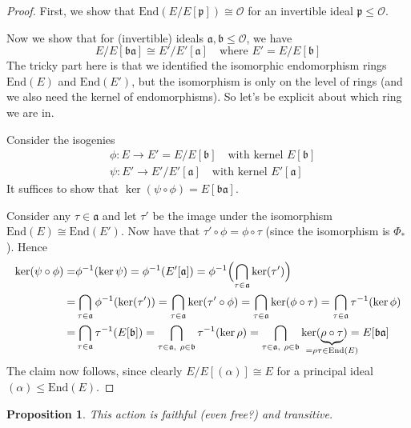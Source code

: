 \documentclass{scrartcl}
\newcommand{\End}{\mathrm{End}}
\newcommand{\Order}{\mathcal{O}}
\newtheorem{prop}{Proposition}[section]
\theoremstyle{definition}
\begin{document}
\begin{proof}
    First, we show that $\End(E/E[\mathfrak{p}]) \cong \Order$ for an invertible ideal $\mathfrak{p} \leq \Order$.

    Now we show that for (invertible) ideals $\mathfrak{a}, \mathfrak{b} \leq \Order$, we have
    \begin{equation*}
        E/E[\mathfrak{b}\mathfrak{a}] \cong E'/E'[\mathfrak{a}] \quad \text{where $E' = E/E[\mathfrak{b}]$}
    \end{equation*}
    The tricky part here is that we identified the isomorphic endomorphism rings $\End(E)$ and $\End(E')$, but the isomorphism is only on the level of rings (and we also need the kernel of endomorphisms).
    So let's be explicit about which ring we are in.

    Consider the isogenies
    \begin{align*}
        &\phi: E \to E' = E/E[\mathfrak{b}] \quad \text{with kernel $E[\mathfrak{b}]$} \\
        &\psi: E' \to E'/E'[\mathfrak{a}] \quad \text{with kernel $E'[\mathfrak{a}]$}
    \end{align*}
    It suffices to show that $\ker(\psi \circ \phi) = E[\mathfrak{b}\mathfrak{a}]$.

    Consider any $\tau \in \mathfrak{a}$ and let $\tau'$ be the image under the isomorphism $\End(E) \cong \End(E')$.
    Now have that $\tau' \circ \phi = \phi \circ \tau$ (since the isomorphism is $\Phi_*$).
    Hence
    \begin{align*}
        \ker(\psi \circ \phi) =& \phi^{-1}(\ker\psi) = \phi^{-1}(E'[\mathfrak{a}]) = \phi^{-1}\Bigl( \bigcap_{\tau \in \mathfrak{a}} \ker(\tau') \Bigr) \\
        =& \bigcap_{\tau \in \mathfrak{a}} \phi^{-1}(\ker(\tau')) = \bigcap_{\tau \in \mathfrak{a}} \ker(\tau' \circ \phi) = \bigcap_{\tau \in \mathfrak{a}} \ker(\phi \circ \tau) = \bigcap_{\tau \in \mathfrak{a}} \tau^{-1}(\ker\phi) \\
        =& \bigcap_{\tau \in \mathfrak{a}} \tau^{-1}(E[\mathfrak{b}]) = \bigcap_{\tau \in \mathfrak{a}, \ \rho \in \mathfrak{b}} \tau^{-1}(\ker\rho) = \bigcap_{\tau \in \mathfrak{a}, \ \rho \in \mathfrak{b}} \ker(\underbrace{\rho \circ \tau}_{\mathclap{= \rho\tau \in \End(E)}}) = E[\mathfrak{b}\mathfrak{a}]
    \end{align*}
    The claim now follows, since clearly $E/E[(\alpha)] \cong E$ for a principal ideal $(\alpha) \leq \End(E)$.
\end{proof}
\begin{prop}
    This action is faithful (even free?) and transitive.
\end{prop}
\end{document}
